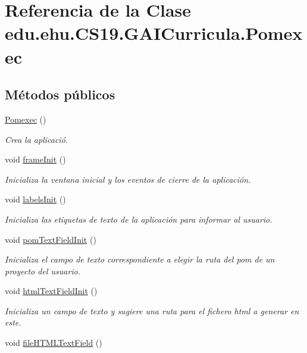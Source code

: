 \hypertarget{a00028}{}\section{Referencia de la Clase edu.\+ehu.\+C\+S19.\+G\+A\+I\+Curricula.\+Pomexec}
\label{a00028}
\subsection*{Métodos públicos}
\begin{DoxyCompactItemize}
\item 
\mbox{\hyperlink{a00028_a8de2bd06d0893d4f24ef2bd8216467cf}{Pomexec}} ()
\begin{DoxyCompactList}\small\item\em Crea la aplicació. \end{DoxyCompactList}\item 
void \mbox{\hyperlink{a00028_a1542762d65badb0de4c9e00d793acd37}{frame\+Init}} ()
\begin{DoxyCompactList}\small\item\em Inicializa la ventana inicial y los eventos de cierre de la aplicación. \end{DoxyCompactList}\item 
void \mbox{\hyperlink{a00028_ab5c03aee261eda106376a3111cadaa0a}{labels\+Init}} ()
\begin{DoxyCompactList}\small\item\em Inicializa las etiquetas de texto de la aplicación para informar al usuario. \end{DoxyCompactList}\item 
void \mbox{\hyperlink{a00028_a99d8b8d9e55a300b5ce6f7cc7d546a26}{pom\+Text\+Field\+Init}} ()
\begin{DoxyCompactList}\small\item\em Inicializa el campo de texto correspondiente a elegir la ruta del pom de un proyecto del usuario. \end{DoxyCompactList}\item 
void \mbox{\hyperlink{a00028_aac5d95af4efdb3dc20e305283cedef95}{html\+Text\+Field\+Init}} ()
\begin{DoxyCompactList}\small\item\em Inicializa un campo de texto y sugiere una ruta para el fichero html a generar en este. \end{DoxyCompactList}\item 
void \mbox{\hyperlink{a00028_aea79b02cfc8fae015e78943e32710210}{file\+H\+T\+M\+L\+Text\+Field}} ()

\end{DoxyCompactItemize}
